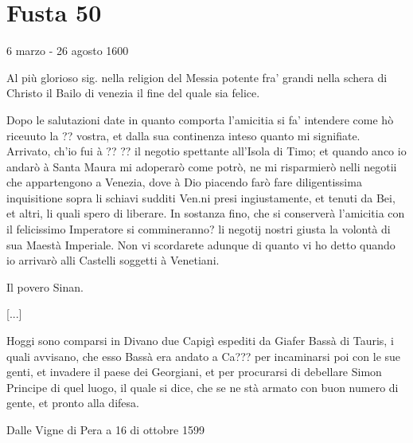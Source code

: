 \section{Fusta 50}

6 marzo - 26 agosto 1600




Al più  glorioso sig.  nella religion del  Messia potente  fra' grandi
nella schera  di Christo  il Bailo  di venezia il  fine del  quale sia
felice.

Dopo  le  salutazioni  date  in  quanto  comporta  l'amicitia  si  fa'
intendere  come hò  riceuuto la  ??  vostra, et  dalla sua  continenza
inteso quanto  mi signifiate. Arrivato, ch'io  fui à ??  ?? il negotio
spettante all'Isola di Timo; et quando anco io andarò à Santa Maura mi
adoperarò come potrò, ne mi risparmierò nelli negotii che appartengono
a Venezia,  dove à Dio piacendo farò  fare diligentissima inquisitione
sopra li schiavi sudditi Ven.ni presi ingiustamente, et tenuti da Bei,
et  altri, li  quali  spero di  liberare.  In sostanza  fino, che  si
conserverà l'amicitia  con il felicissimo  Imperatore si commineranno?
li negotij  nostri giusta la volontà  di sua Maestà  Imperiale. Non vi
scordarete  adunque di  quanto vi  ho  detto quando  io arrivarò  alli
Castelli soggetti à Venetiani.

Il povero Sinan.


\setcounter{docnumber}{9}


\tuttocifrato

[...]

Hoggi sono comparsi  in Divano due Capigì espediti  da Giafer Bassà di
Tauris,  i quali  avvisano,  che esso  Bassà  era andato  a Ca???  per
incaminarsi poi con le sue  genti, et invadere il paese dei Georgiani,
et per procurarsi di debellare  Simon Principe di quel luogo, il quale
si dice, che se ne stà armato con buon numero di gente, et pronto alla
difesa.

\stopcifrato

Dalle Vigne di Pera a 16 di ottobre 1599


